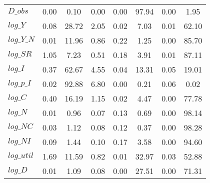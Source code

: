 \begin{center}
\begin{longtable}{lccccccc}
$D\_obs     $	 & 	        0.00	 & 	        0.10	 & 	        0.00	 & 	        0.00	 & 	       97.94	 & 	        0.00	 & 	        1.95 \\ 
$log\_Y     $	 & 	        0.08	 & 	       28.72	 & 	        2.05	 & 	        0.02	 & 	        7.03	 & 	        0.01	 & 	       62.10 \\ 
$log\_Y\_N  $	 & 	        0.01	 & 	       11.96	 & 	        0.86	 & 	        0.22	 & 	        1.25	 & 	        0.00	 & 	       85.70 \\ 
$log\_SR    $	 & 	        1.05	 & 	        7.23	 & 	        0.51	 & 	        0.18	 & 	        3.91	 & 	        0.01	 & 	       87.11 \\ 
$log\_I     $	 & 	        0.37	 & 	       62.67	 & 	        4.55	 & 	        0.04	 & 	       13.31	 & 	        0.05	 & 	       19.01 \\ 
$log\_p\_I  $	 & 	        0.02	 & 	       92.88	 & 	        6.80	 & 	        0.00	 & 	        0.21	 & 	        0.06	 & 	        0.02 \\ 
$log\_C     $	 & 	        0.40	 & 	       16.19	 & 	        1.15	 & 	        0.02	 & 	        4.47	 & 	        0.00	 & 	       77.78 \\ 
$log\_N     $	 & 	        0.01	 & 	        0.96	 & 	        0.07	 & 	        0.13	 & 	        0.69	 & 	        0.00	 & 	       98.14 \\ 
$log\_NC    $	 & 	        0.03	 & 	        1.12	 & 	        0.08	 & 	        0.12	 & 	        0.37	 & 	        0.00	 & 	       98.28 \\ 
$log\_NI    $	 & 	        0.09	 & 	        1.44	 & 	        0.10	 & 	        0.17	 & 	        3.58	 & 	        0.00	 & 	       94.60 \\ 
$log\_util  $	 & 	        1.69	 & 	       11.59	 & 	        0.82	 & 	        0.01	 & 	       32.97	 & 	        0.03	 & 	       52.88 \\ 
$log\_D     $	 & 	        0.01	 & 	        1.09	 & 	        0.08	 & 	        0.00	 & 	       27.51	 & 	        0.00	 & 	       71.31 \\ 
\end{longtable}
 \end{center}
